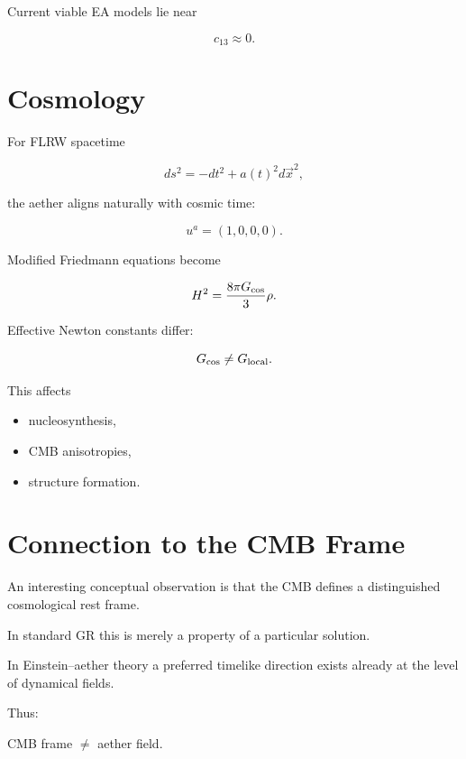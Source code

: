 Current viable EA models lie near

\begin{equation}
c_{13}\approx 0.
\end{equation}

\section{Cosmology}

For FLRW spacetime

\begin{equation}
ds^2
=
-dt^2
+a(t)^2 d\vec{x}^2,
\end{equation}

the aether aligns naturally with cosmic time:

\begin{equation}
u^a=(1,0,0,0).
\end{equation}

Modified Friedmann equations become

\begin{equation}
H^2
=
\frac{8\pi G_{\rm cos}}{3}\rho .
\end{equation}

Effective Newton constants differ:

\begin{equation}
G_{\rm cos}
\neq
G_{\rm local}.
\end{equation}

This affects

\begin{itemize}
\item nucleosynthesis,
\item CMB anisotropies,
\item structure formation.
\end{itemize}

\section{Connection to the CMB Frame}

An interesting conceptual observation is that the CMB defines a
distinguished cosmological rest frame.

In standard GR this is merely a property of a particular solution.

In Einstein--aether theory a preferred timelike direction exists
already at the level of dynamical fields.

Thus:

\begin{center}
CMB frame $\neq$ aether field.
\end{center}


